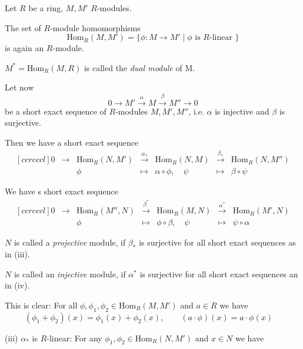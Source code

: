 \documentclass[11pt]{book}
\theoremstyle{nonumberbreak}
\newenvironment{pr}[1][]{\ifthenelse{\equal{#1}{}}{\proof}{\proof[#1]}\rm}{\endproof}
\newenvironment{definprop}[1][]{\ifthenelse{\equal{#1}{}}{\definiprop}{\definiprop[#1]}\rm}{\enddefiniprop}
\begin{document}
\begin{spacing}{1.3}
\begin{definprop}%
Let $R$ be a ring, $M, M'$ $R$-modules.
\begin{compactenum}
\item The set of $R$-module homomorphisms $$\textrm{Hom}_R(M,M')=\{ \phi:M \longrightarrow M' \mid \phi \textrm{ is $R$-linear } \}$$
is again an $R$-module.
\item $M^{*}=\textrm{Hom}_R(M,R)$ is called the \textit{dual module} of M.
\setcounter{temp}{\value{enumi}}
\end{compactenum}
Let now $$0 \longrightarrow M' \overset{\alpha}{\longrightarrow} M \overset{\beta}{\longrightarrow} M'' \longrightarrow 0$$
be a short exact sequence of $R$-modules $M,M',M''$, i.e. $\alpha$ is injective and $\beta$ is surjective.
\begin{compactenum}
\setcounter{enumi}{\value{temp}}
\item Then we have a short exact sequence
$$\begin{matrix}[ccrcccl]0 &\longrightarrow& \textrm{Hom}_R(N,M')& \overset{\alpha_*}{\longrightarrow} &\textrm{Hom}_R(N,M)&\overset{\beta_*}{\longrightarrow} &\textrm{Hom}_R(N,M'') \\ && \phi & \mapsto & \alpha \circ \phi, \quad \psi & \mapsto & \beta \circ \psi \end{matrix}$$
\item We have s short exact sequence
$$\begin{matrix}[ccrcccl]0 & \longrightarrow & \textrm{Hom}_R(M'',N) & \overset{\beta^*}{\longrightarrow} & \textrm{Hom}_R(M,N) & \overset{\alpha^*}{\longrightarrow} & \textrm{Hom}_R(M',N) \\ && \phi & \mapsto & \phi \circ \beta, \quad \psi & \mapsto & \psi \circ \alpha \end{matrix}$$
\item $N$ is called a \textit{projective} module, if $\beta_*$ is surjective for all short exact sequences as in (iii).
\item $N$ is called an \textit{injective}  module, if $\alpha^*$ is surjective for all short exact sequences an in (iv).
\end{compactenum}


\begin{pr}
\begin{compactenum}
\item This is clear: For all $ \phi, \phi_1, \phi_2 \in \textrm{Hom}_R(M,M')$ and $a \in R$ we have
$$\left(\phi_1+\phi_2\right)(x)= \phi_1(x)+\phi_2(x), \qquad \left(a \cdot \phi\right)(x)=a \cdot \phi(x) \quad$$
\item[(iii)]
$\alpha_*$ is $R$-linear: For any $\phi_1, \phi_2 \in \mathrm{Hom}_R(N,M')$ and $x \in N$ we have


\end{compactenum}
\end{pr}
\end{definprop}
\end{spacing}
\end{document}
